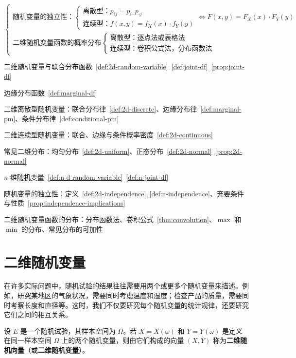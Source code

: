 ﻿\documentclass[lang=cn,11pt]{elegantbook}
\begin{document}
\[\begin{cases}
\text{随机变量的独立性：}
\begin{cases}
\text{离散型：} p_{ij}=p_{i\cdot}p_{\cdot j} \\
\text{连续型：} f(x,y)=f_X(x)\cdot f_Y(y)
\end{cases}
\iff F(x,y)=F_X(x)\cdot F_Y(y) \\[12pt]

\text{二维随机变量函数的概率分布}
\begin{cases}
\text{离散型：逐点法或表格法} \\
\text{连续型：卷积公式法，分布函数法}
\end{cases}
\end{cases}
\]

\begin{introduction}
  \item 二维随机变量与联合分布函数~\ref{def:2d-random-variable}~\ref{def:joint-df}~\ref{prop:joint-df}
  \item 边缘分布函数~\ref{def:marginal-df}
  \item 二维离散型随机变量：联合分布律~\ref{def:2d-discrete}、边缘分布律~\ref{def:marginal-pm}、条件分布律~\ref{def:conditional-pm}
  \item 二维连续型随机变量：联合、边缘与条件概率密度~\ref{def:2d-continuous}
  \item 常见二维分布：均匀分布~\ref{def:2d-uniform}、正态分布~\ref{def:2d-normal}~\ref{prop:2d-normal}
  \item $n$ 维随机变量~\ref{def:n-d-random-variable}~\ref{def:n-joint-df}
  \item 随机变量的独立性：定义~\ref{def:2d-independence}~\ref{def:n-independence}、充要条件与性质~\ref{prop:independence-implications}
  \item 二维随机变量函数的分布：分布函数法、卷积公式~\ref{thm:convolution}、$\max$ 和 $\min$ 的分布、常见分布的可加性
\end{introduction}

\section{二维随机变量}

在许多实际问题中，随机试验的结果往往需要用两个或更多个随机变量来描述。例如，研究某地区的气象状况，需要同时考虑温度和湿度；检查产品的质量，需要同时考察长度和直径等。这时，我们不仅要研究每个随机变量的统计规律，还要研究它们之间的相互关系。

\begin{definition}[二维随机变量] \label{def:2d-random-variable}
设 \(E\) 是一个随机试验，其样本空间为 \(\Omega\)。若 \(X=X(\omega)\) 和 \(Y=Y(\omega)\) 是定义在同一样本空间 \(\Omega\) 上的两个随机变量，则由它们构成的向量 \((X,Y)\) 称为\textbf{二维随机向量}（或\textbf{二维随机变量}）。
\end{definition}
\end{document}
